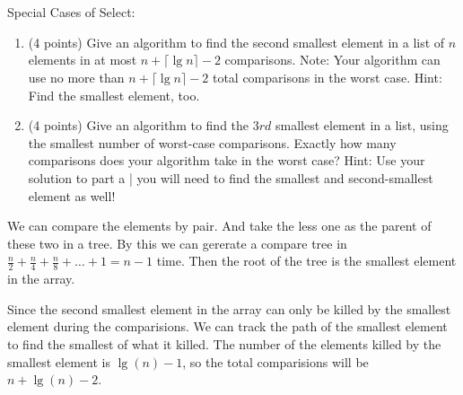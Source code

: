 \documentclass[paper=a4, fontsize=11pt]{scrartcl} %
\begin{document}
\pagebreak

\section{}

\begin{fancyquotes}
  Special Cases of Select:
  \begin{enumerate}
  \item (4 points) Give an algorithm to find the second smallest
    element in a list of $n$ elements in at most $n +
    \lceil\lg{n}\rceil - 2$ comparisons. Note: Your algorithm can use
    no more than $n + \lceil\lg{n}\rceil - 2$ total comparisons in the
    worst case. Hint: Find the smallest element, too.
  \item (4 points) Give an algorithm to find the $3rd$ smallest
    element in a list, using the smallest number of worst-case
    comparisons. Exactly how many comparisons does your algorithm take
    in the worst case? Hint: Use your solution to part a | you will
    need to find the smallest and second-smallest element as well!
  \end{enumerate}
\end{fancyquotes}

We can compare the elements by pair.
And take the less one as the parent of these two in a tree.
By this we can gererate a compare tree in $\frac{n}{2} + \frac{n}{4} +
\frac{n}{8} +\ldots+ 1 = n-1$ time.
Then the root of the tree is the smallest element in the array.

Since the second smallest element in the array can only be killed by
the smallest element during the comparisions.
We can track the path of the smallest element to find the smallest of
what it killed.
The number of the elements killed by the smallest element is
$\lg(n) - 1$, so the total comparisions will be $n + \lg(n) - 2$.
\end{document}

